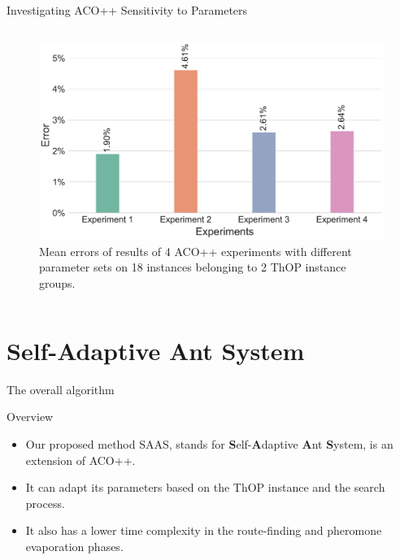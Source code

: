 \documentclass[aspectratio=169]{beamer}
\begin{document}
\begin{frame}{Investigating ACO++ Sensitivity to Parameters}
\begin{columns}
\begin{column}{0.45\textwidth}
            \begin{figure}[h]
                \centering
                \includegraphics[width=\linewidth]{img/sensitive_error_rate.pdf}
                \caption{\footnotesize Mean errors of results of 4 ACO++ experiments with different parameter sets on 18 instances belonging to 2 ThOP instance groups.}
                \label{fig:sensitive}
            \end{figure}
        \end{column}
    \end{columns}
\end{frame}
\section{Self-Adaptive Ant System}
\begin{frame}{The overall algorithm}
    \begin{block}{Overview}
        \begin{itemize}
            \justifying
            \vspace{0.1cm}
            \item Our proposed method SAAS, stands for \textbf{S}elf-\textbf{A}daptive \textbf{A}nt \textbf{S}ystem, is an extension of ACO++.
                  \vspace{0.1cm}
            \item It can adapt its parameters based on the ThOP instance and the search process.
                  \vspace{0.1cm}
            \item It also has a lower time complexity in the route-finding and pheromone evaporation phases.
                  \vspace{0.1cm}
        \end{itemize}
    \end{block}
\end{frame}
\end{document}
